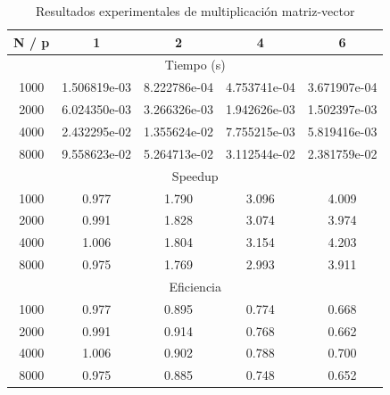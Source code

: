 \begin{table}[htbp]
\centering
\caption{Resultados experimentales de multiplicación matriz-vector}
\label{tab:matvec}
\begin{tabular}{ccccc}
\toprule
N / p & 1 & 2 & 4 & 6 \\
\midrule
\multicolumn{5}{c}{Tiempo (s)} \\
\midrule
1000 & 1.506819e-03 & 8.222786e-04 & 4.753741e-04 & 3.671907e-04 \\
2000 & 6.024350e-03 & 3.266326e-03 & 1.942626e-03 & 1.502397e-03 \\
4000 & 2.432295e-02 & 1.355624e-02 & 7.755215e-03 & 5.819416e-03 \\
8000 & 9.558623e-02 & 5.264713e-02 & 3.112544e-02 & 2.381759e-02 \\
\midrule
\multicolumn{5}{c}{Speedup} \\
\midrule
1000 & 0.977 & 1.790 & 3.096 & 4.009 \\
2000 & 0.991 & 1.828 & 3.074 & 3.974 \\
4000 & 1.006 & 1.804 & 3.154 & 4.203 \\
8000 & 0.975 & 1.769 & 2.993 & 3.911 \\
\midrule
\multicolumn{5}{c}{Eficiencia} \\
\midrule
1000 & 0.977 & 0.895 & 0.774 & 0.668 \\
2000 & 0.991 & 0.914 & 0.768 & 0.662 \\
4000 & 1.006 & 0.902 & 0.788 & 0.700 \\
8000 & 0.975 & 0.885 & 0.748 & 0.652 \\
\bottomrule
\end{tabular}
\end{table}
